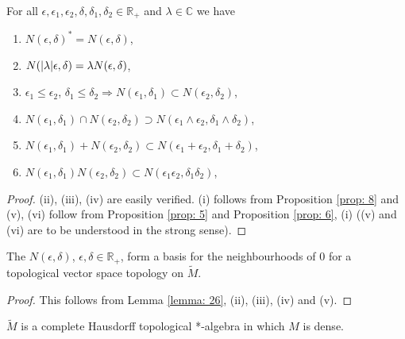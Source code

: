 \begin{lemma}\label{lemma: 26}
    For all $\epsilon,\epsilon_1,\epsilon_2,\delta,\delta_1,\delta_2\in \mathbb{R}_+$ and $\lambda\in \mathbb{C}$ we have
    \begin{enumerate}
        \item $N(\epsilon,\delta)^*=N(\epsilon,\delta)$,
        \item $N(\abs{\lambda}\epsilon,\delta)=\lambda N(\epsilon,\delta)$,
        \item $\epsilon_1\leq \epsilon_2$, $\delta_1\leq \delta_2\Rightarrow N(\epsilon_1,\delta_1)\subset N(\epsilon_2,\delta_2)$,
        \item $N(\epsilon_1,\delta_1)\cap N(\epsilon_2,\delta_2)\supset N(\epsilon_1\wedge \epsilon_2,\delta_1\wedge \delta_2)$,
        \item $N(\epsilon_1,\delta_1)+N(\epsilon_2,\delta_2)\subset N(\epsilon_1+\epsilon_2,\delta_1+\delta_2)$,
        \item $N(\epsilon_1,\delta_1)N(\epsilon_2,\delta_2)\subset N(\epsilon_1\epsilon_2,\delta_1\delta_2)$,
    \end{enumerate}
\end{lemma}
\begin{proof}
    (ii), (iii), (iv) are easily verified. (i) follows from Proposition \ref{prop: 8} and (v), (vi) follow from Proposition \ref{prop: 5} and Proposition \ref{prop: 6}, (i) ((v) and (vi) are to be understood in the strong sense).
\end{proof}
\begin{proposition}
    The $N(\epsilon,\delta)$, $\epsilon,\delta\in \mathbb{R}_+$, form a basis for the neighbourhoods of $0$ for a topological vector space topology on $\widetilde{M}$.
\end{proposition}
\begin{proof}
    This follows from Lemma \ref{lemma: 26}, (ii), (iii), (iv) and (v).
\end{proof}
\begin{theorem}
    $\widetilde{M}$ is a complete Hausdorff topological *-algebra in which $M$ is dense.
\end{theorem}
